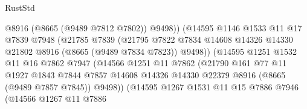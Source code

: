 \begin{lexlean}{RustStd}
\begin{coremodule}
                                    @8916
                                    (@8665 (@9489 @7812 @7802))
                                    @9498))
                                (@14595
                                  @1146
                                  @1533
                                  @11
                                  @17
                                  @7839
                                  @7948
                                  (@21785
                                    @7839
                                    (@21795
                                      @7822
                                      @7834
                                      @14608
                                      @14326
                                      @14330
                                      @21802
                                      @8916
                                      (@8665 (@9489 @7834 @7823))
                                      @9498))
                                  (@14595
                                    @1251
                                    @1532
                                    @11
                                    @16
                                    @7862
                                    @7947
                                    (@14566
                                      @1251
                                      @11
                                      @7862
                                      (@21790
                                        @161
                                        @77
                                        @11
                                        @1927
                                        @1843
                                        @7844
                                        @7857
                                        @14608
                                        @14326
                                        @14330
                                        @22379
                                        @8916
                                        (@8665 (@9489 @7857 @7845))
                                        @9498))
                                    (@14595
                                      @1267
                                      @1531
                                      @11
                                      @15
                                      @7886
                                      @7946
                                      (@14566
                                        @1267
                                        @11
                                        @7886

\end{coremodule}
\end{lexlean}
